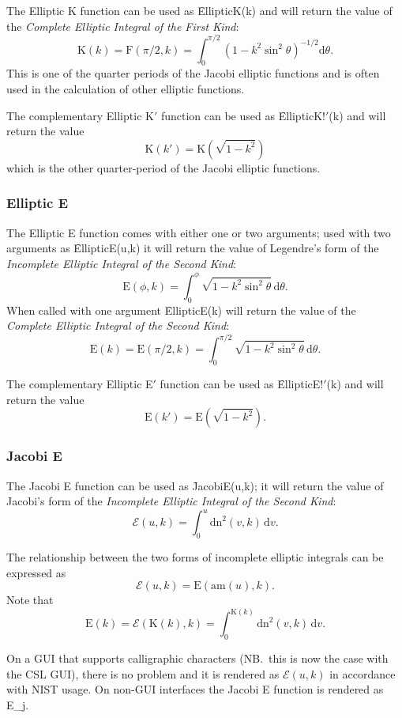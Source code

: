 The Elliptic K function can be used as \f{EllipticK(k)} and will
return the value of the \emph{Complete Elliptic Integral of the
First Kind}:
\[\mathrm{K}(k)=\mathrm{F}(\pi/2, k) =\int_0^{\pi/2}(1-k^2 \sin^2 \theta)^{-1/2}\mathrm{d}\theta.\]
This is one of the quarter periods of the Jacobi elliptic
functions and is often used in the calculation of other elliptic functions.

The complementary Elliptic K$'$ function can be used as \f{EllipticK!$'$(k)}
and will return the value
\[\mathrm{K}(k')=\mathrm{K}(\sqrt{1-k^2})\]
which is the other quarter-period of the Jacobi elliptic functions.

\subsubsection{Elliptic E}
\hypertarget{operator:ELLIPTICE}{}

The Elliptic E function comes with either one or two arguments;
used with two arguments as \f{EllipticE(u,k)}
it will return the value of Legendre's form of
the \emph{Incomplete Elliptic Integral of the Second Kind}:
\[\mathrm{E}(\phi, k)=\int_0^\phi \sqrt{1-k^2 \sin^2 \theta} \,\mathrm{d}\theta.\]
 When called with one argument \f{EllipticE(k)} will return the value of the
\emph{Complete Elliptic Integral of the Second Kind}:
\[\mathrm{E}(k)=\mathrm{E}(\pi/2, k) =
\int_0^{\pi/2} \sqrt{1-k^2 \sin^2 \theta} \,\mathrm{d}\theta.\]

The complementary Elliptic E$'$ function can be used as \f{EllipticE!$'$(k)}
and will return the value
\[\mathrm{E}(k') = \mathrm{E}(\sqrt{1-k^2}).\]

\subsubsection{Jacobi E}
\hypertarget{operator:JACOBIE}{}
The Jacobi E function can be used as  \f{JacobiE(u,k)};
it will return the value of Jacobi's form of
the \emph{Incomplete Elliptic Integral of the Second Kind}:
\[\mathcal{E}(u, k)=\int_0^u \mathrm{dn}^2 (v, k) \,\mathrm{d}v.\]

The relationship between the two forms of incomplete elliptic integrals can
be expressed as
\[\mathcal{E}(u, k) = \mathrm{E}(\mathrm{am}(u), k).\]
Note that
\[\mathrm{E}(k)=\mathcal{E}(\mathrm{K}(k), k)
=\int_0^{\mathrm{K}(k)} \mathrm{dn}^2(v, k) \,\mathrm{d}v.\]

On a GUI that supports calligraphic characters (NB.\ this is now the case with the
CSL GUI), there is no problem and it is rendered as $\mathcal{E}(u,k)$
in accordance with NIST usage.
On non-GUI interfaces the Jacobi E function is rendered as E\_j.

